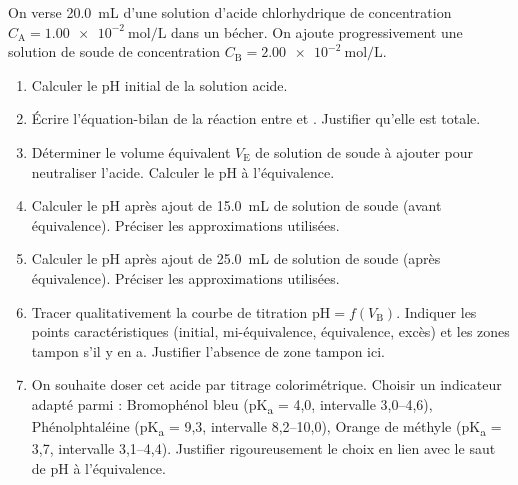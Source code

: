 \documentclass[11pt]{article}
\begin{document}
\begin{exercice}
On verse \SI{20,0}{\mL} d'une solution d'acide chlorhydrique de concentration $C_{\text{A}} = \SI{1,00e-2}{\mol\per\L}$ dans un bécher. On ajoute progressivement une solution de soude  de concentration $C_{\text{B}} = \SI{2,00e-2}{\mol\per\L}$.
\begin{enumerate}
    \item Calculer le pH initial de la solution acide.
    \item Écrire l'équation-bilan de la réaction entre  et . Justifier qu'elle est totale.
    \item Déterminer le volume équivalent $V_{\text{E}}$ de solution de soude à ajouter pour neutraliser l'acide. Calculer le pH à l'équivalence.
    \item Calculer le pH après ajout de \SI{15,0}{\mL} de solution de soude (avant équivalence). Préciser les approximations utilisées.
    \item Calculer le pH après ajout de \SI{25,0}{\mL} de solution de soude (après équivalence). Préciser les approximations utilisées.
    \item Tracer qualitativement la courbe de titration $\text{pH} = f(V_{\text{B}})$. Indiquer les points caractéristiques (initial, mi-équivalence, équivalence, excès) et les zones tampon s'il y en a. Justifier l'absence de zone tampon ici.
    \item On souhaite doser cet acide par titrage colorimétrique. Choisir un indicateur adapté parmi : Bromophénol bleu (pK\textsubscript{a} = 4,0, intervalle 3,0--4,6), Phénolphtaléine (pK\textsubscript{a} = 9,3, intervalle 8,2--10,0), Orange de méthyle (pK\textsubscript{a} = 3,7, intervalle 3,1--4,4). Justifier rigoureusement le choix en lien avec le saut de pH à l'équivalence.
\end{enumerate}
\end{exercice}
\end{document}
